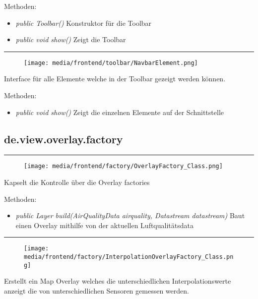Methoden:
\begin{itemize} 
    \item \emph{public Toolbar()} Konstruktor für die Toolbar
    \item \emph{public void show()} Zeigt die Toolbar
\end{itemize}

\rule{\textwidth}{0.4pt} 
\begin{minipage}{0.3\textwidth}
    \begin{figure}[H]
        \texttt{[image: media/frontend/toolbar/NavbarElement.png]}
    \end{figure}
    \end{minipage} \hfill
    \begin{minipage}{0.6\textwidth}
Interface für alle Elemente welche in der Toolbar gezeigt werden können.
\end{minipage}

Methoden:
\begin{itemize} 
    \item \emph{public void show()} Zeigt die einzelnen Elemente auf der Schnittstelle
\end{itemize}

\subsection{de.view.overlay.factory}

\rule{\textwidth}{0.4pt} 
\begin{minipage}{0.3\textwidth}
    \begin{figure}[H]
        \texttt{[image: media/frontend/factory/OverlayFactory\_Class.png]}
    \end{figure}
    \end{minipage} \hfill
    \begin{minipage}{0.6\textwidth}
Kapselt die Kontrolle über die Overlay factories
\end{minipage}

Methoden:
\begin{itemize} 
    \item \emph{public Layer build(AirQualityData airquality,  Datastream datastream)}  Baut einen Overlay mithilfe von der aktuellen Luftqualitätsdata
\end{itemize}

\rule{\textwidth}{0.4pt} 
\begin{minipage}{0.3\textwidth}
    \begin{figure}[H]
        \texttt{[image: media/frontend/factory/InterpolationOverlayFactory\_Class.png]}
    \end{figure}
    \end{minipage} \hfill
    \begin{minipage}{0.6\textwidth}
Erstellt ein Map Overlay welches die unterschiedlichen Interpolationswerte anzeigt die von unterschiedlichen Sensoren gemessen werden.
\end{minipage}

